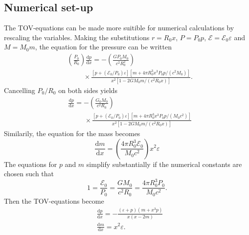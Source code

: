 \documentclass[twocolumn]{article}
\begin{document}
\begin{large}
\subsection*{Numerical set-up}
The TOV-equations can be made more suitible for numerical calculations by rescaling the variables. Making the substitutions $r = R_0x$, $P=P_0p$, $\mathcal{E} = \mathcal{E}_0\varepsilon$ and $M = M_0m$, the equation for the pressure can be written 
\begin{equation}
    \begin{split}
        &\left(\frac{P_0}{R_0}\right)\frac{\text{d}p}{\text{d}x} = -\left(\frac{GP_0M_0}{c^2R_0^2}\right) \\ 
        &\hspace{1cm}\times \frac{\left[p+(\mathcal{E}_0/P_0)\varepsilon\right]\left[m+4\pi R_0^3x^3P_0p/(c^2M_0)\right]}{x^2\left[1-2GM_0m/(c^2R_0x)\right]}.
    \end{split}
\end{equation}
Cancelling $P_0/R_0$ on both sides yields
\begin{equation}
    \begin{split}
        &\frac{\text{d}p}{\text{d}x} = -\left(\frac{G_0M_0}{c^2R_0}\right) \\ 
        &\hspace{1cm}\times \frac{\left[p+(\mathcal{E}_0/P_0)\varepsilon\right]\left[m+4\pi R_0^3x^3P_0p/(M_0c^2)\right]}{x^2\left[1-2GM_0m/(c^2R_0x)\right]}
    \end{split}
\end{equation}
Similarily, the equation for the mass becomes
\begin{equation}
    \frac{\text{d}m}{\text{d}x} = \left(\frac{4\pi R_0^3\mathcal{E}_0}{M_0c^2}\right)x^2\varepsilon
\end{equation}
The equations for $p$ and $m$ simplify substantially if the numerical constants are chosen such that
\begin{equation}
    \label{26maj1005}
    1 = \frac{\mathcal{E}_0}{P_0} = \frac{GM_0}{c^2R_0} = \frac{4\pi R_0^3P_0}{M_0c^2}.
\end{equation}
Then the TOV-equations become
\begin{equation}
    \label{24maj1640}
    \begin{split}
        &\frac{\text{d}p}{\text{d}x} = -\frac{(\varepsilon+p)(m+x^3p)}{x(x-2m)} \\  %
        &\frac{\text{d}m}{\text{d}x} = x^2\varepsilon. %

\end{split}
\end{equation}
\end{large}
\end{document}
